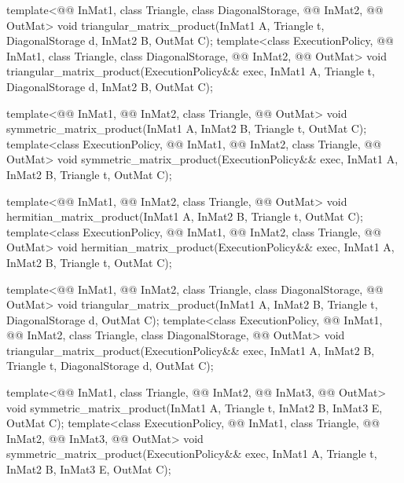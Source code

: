 \begin{codeblock}
{  template<@@ InMat1, class Triangle, class DiagonalStorage,
           @@ InMat2, @@ OutMat>
    void triangular_matrix_product(InMat1 A, Triangle t, DiagonalStorage d, InMat2 B, OutMat C);
  template<class ExecutionPolicy,
           @@ InMat1, class Triangle, class DiagonalStorage,
           @@ InMat2, @@ OutMat>
    void triangular_matrix_product(ExecutionPolicy&& exec,
                                   InMat1 A, Triangle t, DiagonalStorage d, InMat2 B, OutMat C);

  template<@@ InMat1, @@ InMat2, class Triangle, @@ OutMat>
    void symmetric_matrix_product(InMat1 A, InMat2 B, Triangle t, OutMat C);
  template<class ExecutionPolicy,
           @@ InMat1, @@ InMat2, class Triangle, @@ OutMat>
    void symmetric_matrix_product(ExecutionPolicy&& exec,
                                  InMat1 A, InMat2 B, Triangle t, OutMat C);

  template<@@ InMat1, @@ InMat2, class Triangle, @@ OutMat>
    void hermitian_matrix_product(InMat1 A, InMat2 B, Triangle t, OutMat C);
  template<class ExecutionPolicy,
           @@ InMat1, @@ InMat2, class Triangle, @@ OutMat>
    void hermitian_matrix_product(ExecutionPolicy&& exec,
                                  InMat1 A, InMat2 B, Triangle t, OutMat C);

  template<@@ InMat1, @@ InMat2, class Triangle, class DiagonalStorage,
           @@ OutMat>
    void triangular_matrix_product(InMat1 A, InMat2 B, Triangle t, DiagonalStorage d, OutMat C);
  template<class ExecutionPolicy,
           @@ InMat1, @@ InMat2, class Triangle, class DiagonalStorage,
           @@ OutMat>
    void triangular_matrix_product(ExecutionPolicy&& exec,
                                   InMat1 A, InMat2 B, Triangle t, DiagonalStorage d, OutMat C);

  template<@@ InMat1, class Triangle, @@ InMat2, @@ InMat3,
           @@ OutMat>
    void symmetric_matrix_product(InMat1 A, Triangle t, InMat2 B, InMat3 E, OutMat C);
  template<class ExecutionPolicy,
           @@ InMat1, class Triangle, @@ InMat2, @@ InMat3,
           @@ OutMat>
    void symmetric_matrix_product(ExecutionPolicy&& exec,
                                  InMat1 A, Triangle t, InMat2 B, InMat3 E, OutMat C);

}
\end{codeblock}
